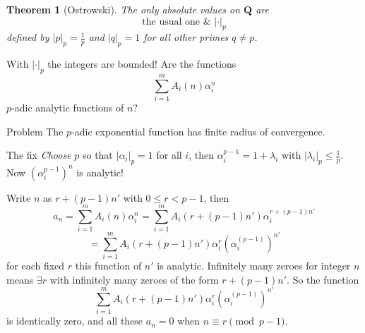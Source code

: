 \documentclass[notheorems]{beamer}
\theoremstyle{plain}
\newtheorem{theorem}{Theorem}[section]
\theoremstyle{definition}
\theoremstyle{definition}
\theoremstyle{definition}
\newcommand{\QQ}{\mathbf Q}
\newcommand{\lt}{<}
\begin{document}
\begin{frame}
\begin{theorem}[{Ostrowski}]\label{theorem-36}
The only absolute values on \(\QQ\) are%
\begin{equation*}
	\text{the usual one}\,\, \&\,\, |\cdot|_p
\end{equation*}
defined by \(|p|_p = \frac1p\) and \(|q|_p = 1\) for all other primes \(q \ne p\).%
\end{theorem}
\pause
With \(|\cdot|_p\) the integers are bounded!
\pause
Are the functions%
\begin{equation*}
\sum_{i=1}^m A_i(n)\alpha_i^n
\end{equation*}
\(p\)-adic analytic functions of \(n\)?%
\par
\pause
\begin{alertblock}{Problem}
The \(p\)-adic exponential function has finite radius of convergence.
\end{alertblock}
\pause
\begin{exampleblock}{The fix}
\emph{Choose} \(p\) so that \(|\alpha_i|_p = 1\) for all \(i\), then \(\alpha_i^{p-1} = 1 + \lambda_i\) with \(|\lambda_i|_p \le \frac 1p\).
Now \((\alpha_i^{p-1})^n\) is analytic!%
\end{exampleblock}
\end{frame}

\begin{frame}
Write \(n\) as \(r + (p-1)n'\) with \(0\le r \lt p-1\)\pause, then
\begin{equation*}
a_n = \sum_{i=1}^m A_i(n)\alpha_i^n = \sum_{i=1}^m A_i(r + (p-1)n')\alpha_i^{r + (p-1)n'}
\end{equation*}
%
\begin{equation*}
= \sum_{i=1}^m A_i(r + (p-1)n')\alpha_i^{r} (\alpha_i^{(p-1)})^{n'}
\end{equation*}
for each fixed \(r\) this function of \(n'\) is analytic.
\pause Infinitely many zeroes for integer \(n\) means \(\exists r\) with infinitely many zeroes of the form \(r + (p-1)n'\). So the function%
\begin{equation*}
\sum_{i=1}^m A_i(r + (p-1)n')\alpha_i^{r} (\alpha_i^{(p-1)})^{n'}
\end{equation*}
is identically zero, and all these \(a_n = 0\) when \(n \equiv r \pmod{p-1}\).%
\par
\end{frame}
\end{document}
